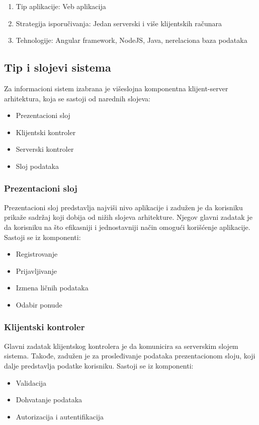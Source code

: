 \documentclass[a4paper]{article}
\begin{document}
\begin{enumerate}
    \item Tip aplikacije: Veb aplikacija
    \item Strategija isporučivanja: Jedan serverski i više klijentskih računara
    \item Tehnologije: Angular framework, NodeJS, Java, nerelaciona baza podataka
\end{enumerate}

\subsection{Tip i slojevi sistema}

Za informacioni sistem izabrana je višeslojna komponentna klijent-server arhitektura, koja se sastoji od narednih slojeva:

\begin{itemize}
    \item Prezentacioni sloj
    \item Klijentski kontroler
    \item Serverski kontroler
    \item Sloj podataka
\end{itemize}


\subsubsection{Prezentacioni sloj}

Prezentacioni sloj predstavlja najviši nivo aplikacije i zadužen je da korisniku prikaže sadržaj koji dobija od nižih slojeva arhitekture. Njegov glavni zadatak je da korisniku na što efikasniji i jednostavniji način omogući korišćenje aplikacije.
\newline
Sastoji se iz komponenti:
\begin{itemize}

\item Registrovanje
\item Prijavljivanje
\item Izmena ličnih podataka
\item Odabir ponude

\end{itemize}
\subsubsection{Klijentski kontroler}

Glavni zadatak klijentskog kontrolera je da komunicira sa serverskim slojem sistema. Takođe, zadužen je za prosleđivanje podataka prezentacionom sloju, koji dalje predstavlja podatke korisniku.
\newline
Sastoji se iz komponenti:
\begin{itemize}
\item Validacija
\item Dohvatanje podataka
\item Autorizacija i autentifikacija
\end{itemize}
\end{document}
